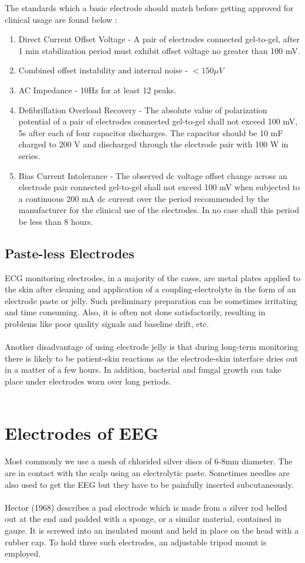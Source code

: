 \documentclass{article}
\begin{document}
The standards which a basic electrode should match before getting approved for clinical usage are found below :
\begin{enumerate}
    \item Direct Current Offset Voltage - A pair of electrodes connected gel-to-gel, after 1 min stabilization period must exhibit offset voltage no greater than 100 mV.
    \item  Combined offset instability and internal noise - $< 150\mu V$
    \item AC Impedance - 10Hz for at least 12 peaks.
    \item Defibrillation Overload Recovery - The absolute value of polarization potential of a pair of electrodes connected gel-to-gel shall not exceed 100 mV, 5s after each of four capacitor discharges. The capacitor should be 10 mF charged to 200 V and discharged through the electrode pair with 100 W in series.
    \item Bias Current Intolerance - The observed dc voltage offset change across an electrode pair connected gel-to-gel shall not exceed 100 mV when subjected to a continuous 200 mA dc current over the period recommended by the manufacturer for the clinical use of the electrodes. In no case shall this period be less than 8 hours.
\end{enumerate}
\subsection{Paste-less Electrodes}
ECG monitoring electrodes, in a majority of the cases, are metal plates applied to the skin after cleaning and application of a coupling-electrolyte in the form of an electrode paste or jelly. Such preliminary preparation can be sometimes irritating and time consuming. Also, it is often not done satisfactorily, resulting in problems like poor quality signals and baseline drift, etc.\\
\\
Another disadvantage of using electrode jelly is that during long-term monitoring there is likely to be patient-skin reactions as the electrode-skin interface dries out in a matter of a few hours. In addition, bacterial and fungal growth can take place under electrodes worn over long periods.\\
\\

\section{Electrodes of EEG}
Most commonly we use a mesh of chlorided silver discs of 6-8mm diameter. The are in contact with the scalp using an electrolytic paste. Sometimes needles are also used to get the EEG but they have to be painfully inserted subcutaneously. \\
\\
Hector (1968) describes a pad electrode which is made from a silver rod belled out at the end and padded with a sponge, or a similar material, contained in gauze. It is screwed into an insulated mount and held in place on the head with a rubber cap. To hold three such electrodes, an adjustable tripod mount is employed. 
\end{document}
